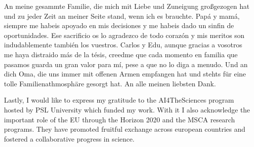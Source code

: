 An meine gesammte Familie, die mich mit Liebe und Zuneigung gro{\ss}gezogen hat und zu jeder Zeit an meiner Seite stand, wenn ich es brauchte. Papá y mamá, siempre me habeis apoyado en mis decisiones y me habeis dado un sinfin de oportunidades. Ese sacrificio os lo agradezco de todo corazón y mis meritos son indudablemente también los vuestros. Carlos y Edu, aunque gracias a vosotros me haya distraido más de la tésis, creedme que cada momento en familia que pasamos guarda un gran valor para mí, pese a que no lo diga a menudo. Und an dich Oma, die uns immer mit offenen Armen empfangen hat und stehts für eine tolle Familienathmosphäre gesorgt hat. An alle meinen liebsten Dank.

Lastly, I would like to express my gratitude to the AI4TheSciences program hosted by PSL University which funded my work. With it I also acknowledge the important role of the EU through the Horizon 2020 and the MSCA research programs. They have promoted fruitful exchange across european countries and fostered a collaborative progress in science.

